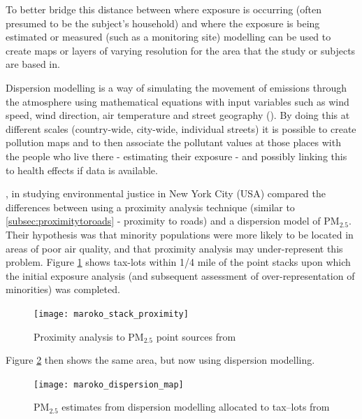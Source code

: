 To better bridge this distance between where exposure is occurring (often presumed to be the subject's household) and where the exposure is being estimated or measured (such as a monitoring site) modelling can be used to create maps or layers of varying resolution for the area that the study or subjects are based in.

Dispersion modelling is a way of simulating the movement of emissions through the atmosphere using mathematical equations with input variables such as wind speed, wind direction, air temperature and street geography (\cite{EnvironmentalProtectionAgency2008}). By doing this at different scales (country-wide, city-wide, individual streets) it is possible to create pollution maps and to then associate the pollutant values at those places with the people who live there - estimating their exposure - and possibly linking this to health effects if data is available.


\cite{Maroko2012}, in studying environmental justice in New York City (USA) compared the differences between using a proximity analysis technique (similar to \ref{subsec:proximitytoroads} - proximity to roads) and a dispersion model of PM$_{2.5}$. Their hypothesis was that minority populations were more likely to be located in areas of poor air quality, and that proximity analysis may under-represent this problem. Figure \ref{fig:maroko_stack_proximity} shows tax-lots within 1\slash4 mile of the point stacks upon which the initial exposure analysis (and subsequent assessment of over-representation of minorities) was completed. 

\begin{figure}[H]
\centering
\texttt{[image: maroko\_stack\_proximity]}
\caption{Proximity analysis to PM$_{2.5}$ point sources from \cite{Maroko2012}}
\label{fig:maroko_stack_proximity}
\end{figure}

Figure \ref{fig:maroko_dispersion_map} then shows the same area, but now using dispersion modelling.

\begin{figure}[H]
\centering
\texttt{[image: maroko\_dispersion\_map]}
\caption{PM$_{2.5}$ estimates from dispersion modelling allocated to tax--lots from \cite{Maroko2012}}
\label{fig:maroko_dispersion_map}
\end{figure}

